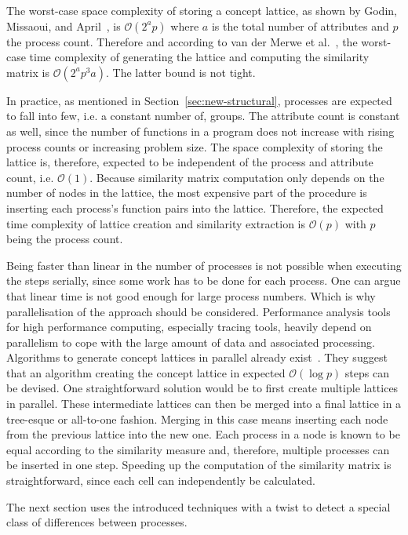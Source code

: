 \documentclass[a4paper, final, diplominf]{zih-template}
\begin{document}
The worst-case space complexity of storing a concept lattice, as shown by Godin, Missaoui, and April~\cite{godin93}, is $\mathcal{O}(2^ap)$ where $a$ is the total number of attributes and $p$ the process count.
Therefore and according to van der Merwe et al.~\cite{van04}, the worst-case time complexity of generating the lattice and computing the similarity matrix is $\mathcal{O}(2^ap^3a)$.
The latter bound is not tight.

In practice, as mentioned in Section~\ref{sec:new-structural}, processes are expected to fall into few, i.e. a constant number of, groups.
The attribute count is constant as well, since the number of functions in a program does not increase with rising process counts or increasing problem size.
The space complexity of storing the lattice is, therefore, expected to be independent of the process and attribute count, i.e. $\mathcal{O}(1)$.
Because similarity matrix computation only depends on the number of nodes in the lattice, the most expensive part of the procedure is inserting each process's function pairs into the lattice.
Therefore, the expected time complexity of lattice creation and similarity extraction is $\mathcal{O}(p)$ with $p$ being the process count.

Being faster than linear in the number of processes is not possible when executing the steps serially, since some work has to be done for each process.
One can argue that linear time is not good enough for large process numbers.
Which is why parallelisation of the approach should be considered.
Performance analysis tools for high performance computing, especially tracing tools, heavily depend on parallelism to cope with the large amount of data and associated processing.
Algorithms to generate concept lattices in parallel already exist~\cite{hu07, liu03, njiwoua97}.
They suggest that an algorithm creating the concept lattice in expected $\mathcal{O}(\log p)$ steps can be devised.
One straightforward solution would be to first create multiple lattices in parallel.
These intermediate lattices can then be merged into a final lattice in a tree-esque or all-to-one fashion.
Merging in this case means inserting each node from the previous lattice into the new one.
Each process in a node is known to be equal according to the similarity measure and, therefore, multiple processes can be inserted in one step.
Speeding up the computation of the similarity matrix is straightforward, since each cell can independently be calculated.

The next section uses the introduced techniques with a twist to detect a special class of differences between processes.
\end{document}

